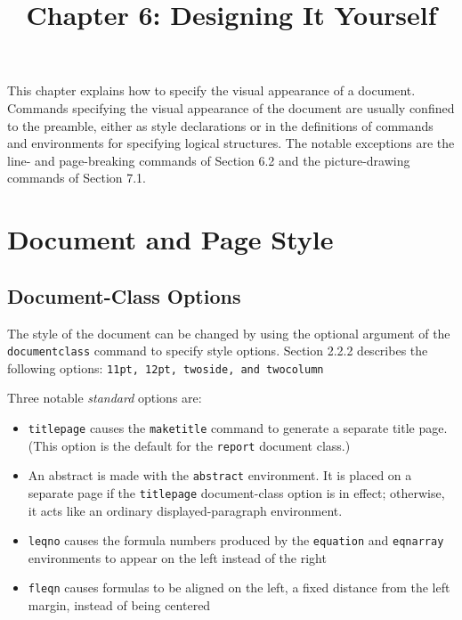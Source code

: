 \documentclass{article}
\title{Chapter 6: Designing It Yourself} %
\author{}
\date{}
\begin{document}
\maketitle %

This chapter explains how to specify the visual appearance of a document. Commands specifying the
visual appearance of the document are usually confined to the preamble, either as style
declarations or in the definitions of commands and environments for specifying logical structures.
The notable exceptions are the line- and page-breaking commands of Section 6.2 and the
picture-drawing commands of Section 7.1.

\section{Document and Page Style}

\subsection{Document-Class Options}

The style of the document can be changed by using the optional argument of the \verb:documentclass:
command to specify style options. Section 2.2.2 describes the following options: 
\verb:11pt, 12pt, twoside, and twocolumn:

Three notable \emph{standard} options are:

\begin{itemize}
   
   \item {\tt titlepage} causes the \verb:maketitle: command to generate a separate title page.
    (This option is the default for the {\tt report} document class.)
   
   \item An abstract is made with the \texttt{abstract} environment. It is placed on a separate page
    if the \texttt{titlepage} document-class option is in effect; otherwise, it acts like an
    ordinary displayed-paragraph environment.

   \item {\tt leqno} causes the formula numbers produced by the {\tt equation} and {\tt eqnarray}
    environments to appear on the left instead of the right
   
   \item {\tt fleqn} causes formulas to be aligned on the left, a fixed distance from the left
    margin, instead of being centered
\end{itemize}
\end{document}
